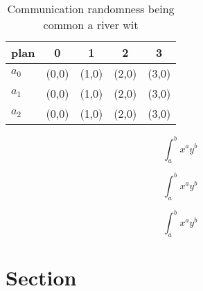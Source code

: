 \documentclass[a4paper]{article}
\begin{document}
\begin{table}
\begin{adjustbox}{width=0.5\columnwidth}
\begin{tabular}{|l|l|l|l|l|}
\hline
\textbf{plan} & \multicolumn{1}{c|}{\textbf{0}} & \multicolumn{1}{c|}{\textbf{1}} & \multicolumn{1}{c|}{\textbf{2}} & \multicolumn{1}{c|}{\textbf{3}} \\ \hline
\textbf{$a_0$}  & (0,0) & (1,0) & (2,0) & (3,0) \\ \hline
\textbf{$a_1$}  & (0,0) & (1,0) & (2,0) & (3,0) \\ \hline
\textbf{$a_2$}  & (0,0) & (1,0) & (2,0) & (3,0) \\ \hline
\end{tabular}
\end{adjustbox}
\caption{Communication randomness being common a river wit
}
\end{table}

\[ \int_{a}^{b}{x^{a}y^{b}} \]

\[ \int_{a}^{b}{x^{a}y^{b}} \]

\[ \int_{a}^{b}{x^{a}y^{b}} \]

\section{Section}
\end{document}

